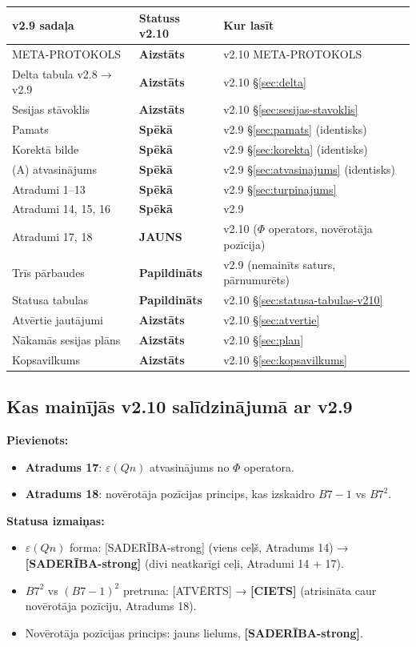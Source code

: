 \documentclass[12pt,a4paper]{article}
\begin{document}
\begin{longtable}{|l|l|l|}
\hline
\textbf{v2.9 sadaļa} & \textbf{Statuss v2.10} & \textbf{Kur lasīt} \\
\hline
\endhead
META-PROTOKOLS & \textbf{Aizstāts} & v2.10 META-PROTOKOLS \\
Delta tabula v2.8$\to$v2.9 & \textbf{Aizstāts} & v2.10 §\ref{sec:delta} \\
Sesijas stāvoklis & \textbf{Aizstāts} & v2.10 §\ref{sec:sesijas-stavoklis} \\
\hline
Pamats & \textbf{Spēkā} & v2.9 §\ref{sec:pamats} (identisks) \\
Korektā bilde & \textbf{Spēkā} & v2.9 §\ref{sec:korekta} (identisks) \\
(A) atvasinājums & \textbf{Spēkā} & v2.9 §\ref{sec:atvasinajums} (identisks) \\
\hline
Atradumi 1–13 & \textbf{Spēkā} & v2.9 §\ref{sec:turpinajums} \\
Atradumi 14, 15, 16 & \textbf{Spēkā} & v2.9 \\
Atradumi 17, 18 & \textbf{JAUNS} & v2.10 ($\Phi$ operators, novērotāja pozīcija) \\
\hline
Trīs pārbaudes & \textbf{Papildināts} & v2.9 (nemainīts saturs, pārnumurēts) \\
Statusa tabulas & \textbf{Papildināts} & v2.10 §\ref{sec:statusa-tabulas-v210} \\
Atvērtie jautājumi & \textbf{Aizstāts} & v2.10 §\ref{sec:atvertie} \\
Nākamās sesijas plāns & \textbf{Aizstāts} & v2.10 §\ref{sec:plan} \\
Kopsavilkums & \textbf{Aizstāts} & v2.10 §\ref{sec:kopsavilkums} \\
\hline
\end{longtable}

\subsection*{Kas mainījās v2.10 salīdzinājumā ar v2.9}

\textbf{Pievienots:}
\begin{itemize}
    \item \textbf{Atradums 17}: $\varepsilon(Qn)$ atvasinājums no $\Phi$ operatora.
    \item \textbf{Atradums 18}: novērotāja pozīcijas princips, kas izskaidro $B7-1$ vs $B7^2$.
\end{itemize}

\textbf{Statusa izmaiņas:}
\begin{itemize}
    \item $\varepsilon(Qn)$ forma: [SADERĪBA-strong] (viens ceļš, Atradums 14) → \textbf{[SADERĪBA-strong]} (divi neatkarīgi ceļi, Atradumi 14 + 17).
    \item $B7^2$ vs $(B7-1)^2$ pretruna: [ATVĒRTS] → \textbf{[CIETS]} (atrisināta caur novērotāja pozīciju, Atradums 18).
    \item Novērotāja pozīcijas princips: jauns lielums, \textbf{[SADERĪBA-strong]}.
\end{itemize}
\end{document}
